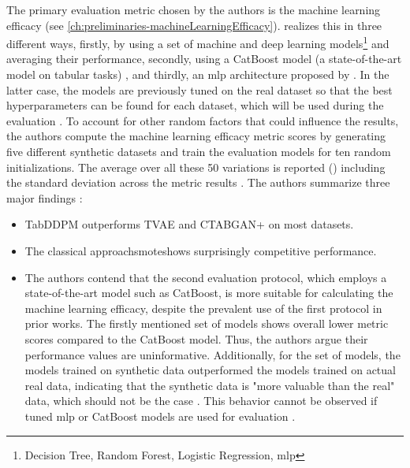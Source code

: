 The primary evaluation metric chosen by the authors is the machine learning efficacy (see \autoref{ch:preliminaries-machineLearningEfficacy}).
\textcite{kotelnikov2022TabDDPMModellingTabular} realizes this in three different ways, firstly, by using a set of machine and deep learning models\footnote[1]{Decision Tree, Random Forest, Logistic Regression, \gls{mlp}} and averaging their performance,
secondly, using a CatBoost model \cite{prokhorenkova2018CatBoostUnbiasedBoosting}(a state-of-the-art model on tabular tasks) \cite{kotelnikov2022TabDDPMModellingTabular}, and thirdly, an \gls{mlp} architecture proposed by \cite{gorishniy2021RevisitingDeepLearning}.
In the latter case, the models are previously tuned on the real dataset so that the best hyperparameters can be found for each dataset, which will be used during the evaluation \cite{kotelnikov2022TabDDPMModellingTabular}.
To account for other random factors that could influence the results, the authors compute the machine learning efficacy metric scores by generating five different synthetic datasets and train the evaluation models for ten random initializations.
The average over all these 50 variations is reported (\cite[Table 3, 4, p. 8]{kotelnikov2022TabDDPMModellingTabular}) including the standard deviation across the metric results \cite{kotelnikov2022TabDDPMModellingTabular}.
The authors summarize three major findings \cite{kotelnikov2022TabDDPMModellingTabular}:
\begin{itemize}
    \item TabDDPM outperforms TVAE and CTABGAN+ on most datasets.
    \item The classical approach\gls{smote}shows surprisingly competitive performance.
    \item The authors contend that the second evaluation protocol, which employs a state-of-the-art model such as CatBoost, is more suitable for calculating the machine learning efficacy, 
    despite the prevalent use of the first protocol in prior works. 
    The firstly mentioned set of models shows overall lower metric scores compared to the CatBoost model.
    Thus, the authors argue their performance values are uninformative.
    Additionally, for the set of models, the models trained on synthetic data outperformed the models trained on actual real data, indicating that the 
    synthetic data is "more valuable than the real" data, which should not be the case \cite[p. 8]{kotelnikov2022TabDDPMModellingTabular}.
    This behavior cannot be observed if tuned \gls{mlp} or CatBoost models are used for evaluation \cite{kotelnikov2022TabDDPMModellingTabular}.
\end{itemize}

